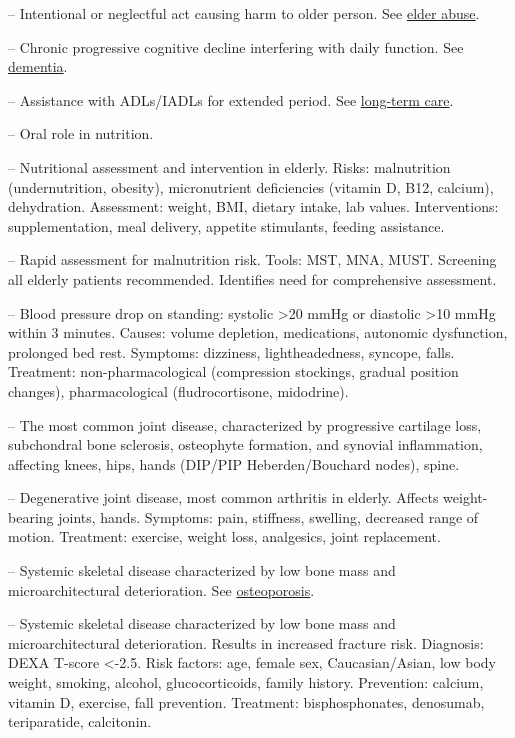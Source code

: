 -- Intentional or neglectful act causing harm to older person. See \hyperlink{Elder Abuse}{elder abuse}.

-- Chronic progressive cognitive decline interfering with daily function. See \hyperlink{Dementia}{dementia}.

-- Assistance with ADLs/IADLs for extended period. See \hyperlink{Long-Term Care}{long-term care}.


-- Oral role in nutrition.


-- Nutritional assessment and intervention in elderly. Risks: malnutrition (undernutrition, obesity), micronutrient deficiencies (vitamin D, B12, calcium), dehydration. Assessment: weight, BMI, dietary intake, lab values. Interventions: supplementation, meal delivery, appetite stimulants, feeding assistance.

-- Rapid assessment for malnutrition risk. Tools: MST, MNA, MUST. Screening all elderly patients recommended. Identifies need for comprehensive assessment.

-- Blood pressure drop on standing: systolic >20 mmHg or diastolic >10 mmHg within 3 minutes. Causes: volume depletion, medications, autonomic dysfunction, prolonged bed rest. Symptoms: dizziness, lightheadedness, syncope, falls. Treatment: non-pharmacological (compression stockings, gradual position changes), pharmacological (fludrocortisone, midodrine).

-- The most common joint disease, characterized by progressive cartilage loss, subchondral bone sclerosis, osteophyte formation, and synovial inflammation, affecting knees, hips, hands (DIP/PIP Heberden/Bouchard nodes), spine.

-- Degenerative joint disease, most common arthritis in elderly. Affects weight-bearing joints, hands. Symptoms: pain, stiffness, swelling, decreased range of motion. Treatment: exercise, weight loss, analgesics, joint replacement.


-- Systemic skeletal disease characterized by low bone mass and microarchitectural deterioration. See \hyperlink{Osteoporosis}{osteoporosis}.

-- Systemic skeletal disease characterized by low bone mass and microarchitectural deterioration. Results in increased fracture risk. Diagnosis: DEXA T-score <-2.5. Risk factors: age, female sex, Caucasian/Asian, low body weight, smoking, alcohol, glucocorticoids, family history. Prevention: calcium, vitamin D, exercise, fall prevention. Treatment: bisphosphonates, denosumab, teriparatide, calcitonin.

